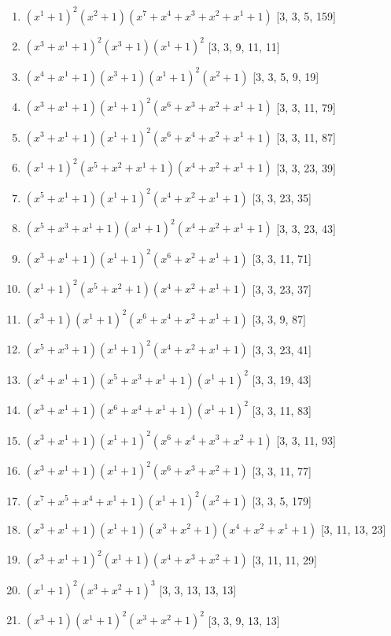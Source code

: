 \documentclass[10pt,twocolumn]{article}
\begin{document}
\begin{enumerate}
\item $(x^{1} + 1)^{2}(x^{2} + 1)(x^{7} + x^{4} + x^{3} + x^{2} + x^{1} + 1)$  [3, 3, 5, 159]
\item $(x^{3} + x^{1} + 1)^{2}(x^{3} + 1)(x^{1} + 1)^{2}$  [3, 3, 9, 11, 11]
\item $(x^{4} + x^{1} + 1)(x^{3} + 1)(x^{1} + 1)^{2}(x^{2} + 1)$  [3, 3, 5, 9, 19]
\item $(x^{3} + x^{1} + 1)(x^{1} + 1)^{2}(x^{6} + x^{3} + x^{2} + x^{1} + 1)$  [3, 3, 11, 79]
\item $(x^{3} + x^{1} + 1)(x^{1} + 1)^{2}(x^{6} + x^{4} + x^{2} + x^{1} + 1)$  [3, 3, 11, 87]
\item $(x^{1} + 1)^{2}(x^{5} + x^{2} + x^{1} + 1)(x^{4} + x^{2} + x^{1} + 1)$  [3, 3, 23, 39]
\item $(x^{5} + x^{1} + 1)(x^{1} + 1)^{2}(x^{4} + x^{2} + x^{1} + 1)$  [3, 3, 23, 35]
\item $(x^{5} + x^{3} + x^{1} + 1)(x^{1} + 1)^{2}(x^{4} + x^{2} + x^{1} + 1)$  [3, 3, 23, 43]
\item $(x^{3} + x^{1} + 1)(x^{1} + 1)^{2}(x^{6} + x^{2} + x^{1} + 1)$  [3, 3, 11, 71]
\item $(x^{1} + 1)^{2}(x^{5} + x^{2} + 1)(x^{4} + x^{2} + x^{1} + 1)$  [3, 3, 23, 37]
\item $(x^{3} + 1)(x^{1} + 1)^{2}(x^{6} + x^{4} + x^{2} + x^{1} + 1)$  [3, 3, 9, 87]
\item $(x^{5} + x^{3} + 1)(x^{1} + 1)^{2}(x^{4} + x^{2} + x^{1} + 1)$  [3, 3, 23, 41]
\item $(x^{4} + x^{1} + 1)(x^{5} + x^{3} + x^{1} + 1)(x^{1} + 1)^{2}$  [3, 3, 19, 43]
\item $(x^{3} + x^{1} + 1)(x^{6} + x^{4} + x^{1} + 1)(x^{1} + 1)^{2}$  [3, 3, 11, 83]
\item $(x^{3} + x^{1} + 1)(x^{1} + 1)^{2}(x^{6} + x^{4} + x^{3} + x^{2} + 1)$  [3, 3, 11, 93]
\item $(x^{3} + x^{1} + 1)(x^{1} + 1)^{2}(x^{6} + x^{3} + x^{2} + 1)$  [3, 3, 11, 77]
\item $(x^{7} + x^{5} + x^{4} + x^{1} + 1)(x^{1} + 1)^{2}(x^{2} + 1)$  [3, 3, 5, 179]
\item $(x^{3} + x^{1} + 1)(x^{1} + 1)(x^{3} + x^{2} + 1)(x^{4} + x^{2} + x^{1} + 1)$  [3, 11, 13, 23]
\item $(x^{3} + x^{1} + 1)^{2}(x^{1} + 1)(x^{4} + x^{3} + x^{2} + 1)$  [3, 11, 11, 29]
\item $(x^{1} + 1)^{2}(x^{3} + x^{2} + 1)^{3}$  [3, 3, 13, 13, 13]
\item $(x^{3} + 1)(x^{1} + 1)^{2}(x^{3} + x^{2} + 1)^{2}$  [3, 3, 9, 13, 13]

\end{enumerate}
\end{document}
